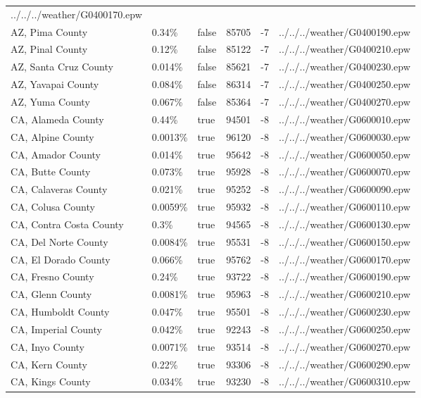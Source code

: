 \begin{longtable}[]{@{}llllll@{}}
../../../weather/G0400170.epw \\
AZ, Pima County & 0.34\% & false & 85705 & -7 &
../../../weather/G0400190.epw \\
AZ, Pinal County & 0.12\% & false & 85122 & -7 &
../../../weather/G0400210.epw \\
AZ, Santa Cruz County & 0.014\% & false & 85621 & -7 &
../../../weather/G0400230.epw \\
AZ, Yavapai County & 0.084\% & false & 86314 & -7 &
../../../weather/G0400250.epw \\
AZ, Yuma County & 0.067\% & false & 85364 & -7 &
../../../weather/G0400270.epw \\
CA, Alameda County & 0.44\% & true & 94501 & -8 &
../../../weather/G0600010.epw \\
CA, Alpine County & 0.0013\% & true & 96120 & -8 &
../../../weather/G0600030.epw \\
CA, Amador County & 0.014\% & true & 95642 & -8 &
../../../weather/G0600050.epw \\
CA, Butte County & 0.073\% & true & 95928 & -8 &
../../../weather/G0600070.epw \\
CA, Calaveras County & 0.021\% & true & 95252 & -8 &
../../../weather/G0600090.epw \\
CA, Colusa County & 0.0059\% & true & 95932 & -8 &
../../../weather/G0600110.epw \\
CA, Contra Costa County & 0.3\% & true & 94565 & -8 &
../../../weather/G0600130.epw \\
CA, Del Norte County & 0.0084\% & true & 95531 & -8 &
../../../weather/G0600150.epw \\
CA, El Dorado County & 0.066\% & true & 95762 & -8 &
../../../weather/G0600170.epw \\
CA, Fresno County & 0.24\% & true & 93722 & -8 &
../../../weather/G0600190.epw \\
CA, Glenn County & 0.0081\% & true & 95963 & -8 &
../../../weather/G0600210.epw \\
CA, Humboldt County & 0.047\% & true & 95501 & -8 &
../../../weather/G0600230.epw \\
CA, Imperial County & 0.042\% & true & 92243 & -8 &
../../../weather/G0600250.epw \\
CA, Inyo County & 0.0071\% & true & 93514 & -8 &
../../../weather/G0600270.epw \\
CA, Kern County & 0.22\% & true & 93306 & -8 &
../../../weather/G0600290.epw \\
CA, Kings County & 0.034\% & true & 93230 & -8 &
../../../weather/G0600310.epw \\

\end{longtable}
